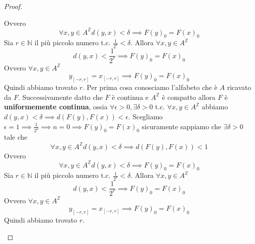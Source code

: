 \begin{teorema} 
\begin{proof}
\begin{itemize}
                  Ovvero $$\forall x,y \in A^\mathbb{Z} d(y,x)<\delta \implies F(y)_0= F(x)_0$$
                  Sia $r\in \mathbb{N}$ il più piccolo numero t.c. $\frac{1}{2^r}<\delta$.
                  Allora $\forall x,y \in A^\mathbb{Z}$
                  $$d(y,x)<\frac{1}{2^r} \implies F(y)_0= F(x)_0$$
                  Ovvero $\forall x,y \in A^\mathbb{Z}$
                  $$y_{[-r,r]} =x_{[-r,r]}\implies F(y)_0= F(x)_0$$
                  Quindi abbiamo trovato $r$.
                  Per prima cosa conosciamo l'alfabeto che è $A$ ricavato da $F$. Successivamente
                  datto che $F$ è continua e $A^\mathbb{Z}$ è compatto allora $F$ è \textbf{uniformemente
                      continua}, ossia $\forall\epsilon >0,\exists \delta > 0 \text{ t.c. } \forall x,y \in A^\mathbb{Z}$
                  abbiamo $d(y,x)<\delta \implies d(F(y), F(x)) < \epsilon$. Scegliamo $\epsilon = 1\implies \frac{1}{2^0}\implies n=0\implies F(y)_0= F(x)_0$
                  sicuramente sappiamo che $\exists \delta >0$ tale che $$\forall x,y \in A^\mathbb{Z} d(y,x)<\delta \implies d(F(y), F(x)) < 1$$
                  Ovvero $$\forall x,y \in A^\mathbb{Z} d(y,x)<\delta \implies F(y)_0= F(x)_0$$
                  Sia $r\in \mathbb{N}$ il più piccolo numero t.c. $\frac{1}{2^r}<\delta$.
                  Allora $\forall x,y \in A^\mathbb{Z}$
                  $$d(y,x)<\frac{1}{2^r} \implies F(y)_0= F(x)_0$$
                  Ovvero $\forall x,y \in A^\mathbb{Z}$
                  $$y_{[-r,r]} =x_{[-r,r]}\implies F(y)_0= F(x)_0$$
                  Quindi abbiamo trovato $r$.


\end{itemize}
\end{proof}
\end{teorema}
